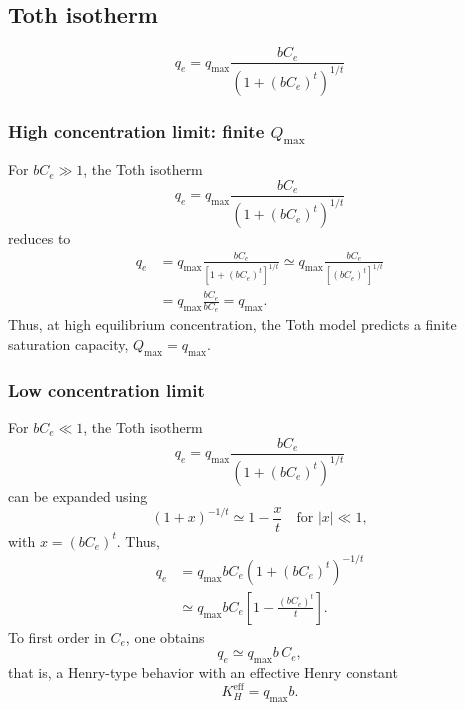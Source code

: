 \documentclass[12pt]{article}
\begin{document}
	
	\subsection{Toth isotherm}
	\[
	q_e = q_{\max} \frac{b C_e}{\left(1 + (b C_e)^{t}\right)^{1/t}}
	\]
	
	\subsubsection{High concentration limit: finite $Q_{\max}$}
	
	For $b C_e \gg 1$, the Toth isotherm
	\[
	q_e = q_{\max} \frac{b C_e}{\left(1 + (b C_e)^{t}\right)^{1/t}}
	\]
	reduces to
	\begin{align}
		q_e 
		&= q_{\max} \frac{b C_e}{\left[1 + (b C_e)^{t}\right]^{1/t}}
		\simeq q_{\max} \frac{b C_e}{\left[(b C_e)^{t}\right]^{1/t}} \nonumber \\
		&= q_{\max} \frac{b C_e}{b C_e}
		= q_{\max}.
	\end{align}
	Thus, at high equilibrium concentration, the Toth model predicts a finite saturation capacity, $Q_{\max} = q_{\max}$.
	
	\subsubsection{Low concentration limit}
	
	For $b C_e \ll 1$, the Toth isotherm
	\[
	q_e = q_{\max} \frac{b C_e}{\left(1 + (b C_e)^{t}\right)^{1/t}}
	\]
	can be expanded using
	\[
	\left(1 + x\right)^{-1/t} \simeq 1 - \frac{x}{t} \quad \text{for } |x| \ll 1,
	\]
	with $x = (b C_e)^{t}$. Thus,
	\begin{align}
		q_e
		&= q_{\max} b C_e \left(1 + (b C_e)^{t}\right)^{-1/t} \nonumber \\
		&\simeq q_{\max} b C_e \left[1 - \frac{(b C_e)^{t}}{t}\right].
	\end{align}
	To first order in $C_e$, one obtains
	\begin{equation}
		q_e \simeq q_{\max} b\, C_e,
	\end{equation}
	that is, a Henry-type behavior with an effective Henry constant
	\begin{equation}
		K_H^{\mathrm{eff}} = q_{\max} b.
	\end{equation}
	
	
	
\end{document}
